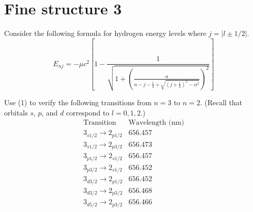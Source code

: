 

\section*{Fine structure 3}

Consider the following formula for hydrogen energy levels where $j=|l\pm1/2|$.
\begin{equation*}
E_{nj}=-\mu c^2\left[1-\frac{1}{\sqrt{\displaystyle1
+\left(\frac{\alpha}{n-j-\frac{1}{2}+\sqrt{\left(j+\frac{1}{2}\right)^2-\alpha^2}}\right)^2}}\right]
\tag{1}
\end{equation*}

Use (1) to verify the following transitions from $n=3$ to $n=2$.
(Recall that orbitals $s$, $p$, and $d$ correspond to $l=0,1,2$.)
\begin{equation*}
\begin{matrix}
\text{Transition} & \text{Wavelength (nm)}
\\[1ex]
3_{s1/2}\rightarrow2_{p1/2} & 656.457
\\
3_{s1/2}\rightarrow2_{p3/2} & 656.473
\\[1ex]
3_{p1/2}\rightarrow2_{s1/2} & 656.457
\\
3_{p3/2}\rightarrow2_{s1/2} & 656.452
\\[1ex]
3_{d3/2}\rightarrow2_{p1/2} & 656.452
\\
3_{d3/2}\rightarrow2_{p3/2} & 656.468
\\
3_{d5/2}\rightarrow2_{p3/2} & 656.466
\end{matrix}
\end{equation*}


